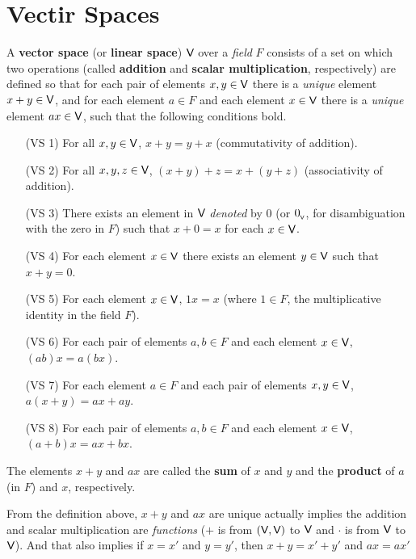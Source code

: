 \section{Vectir Spaces} \label{sec 1.2}

\begin{definition} \label{def 1.1}
A \textbf{vector space} (or \textbf{linear space}) \(\textsf{V}\) over a \emph{field} \(F\) consists of a set on which two operations (called \textbf{addition} and \textbf{scalar multiplication}, respectively) are defined
so that for each pair of elements \(x, y \in \textsf{V}\) there is a \emph{unique} element \(x + y \in \textsf{V}\),
and for each element \(a \in F\) and each element \(x \in \textsf{V}\) there is a \emph{unique} element \(ax \in \textsf{V}\), such that the following conditions bold.
\begin{itemize}
    \item[(VS 1)] For all \(x, y \in \textsf{V}\), \(x + y = y + x\) (commutativity of addition).
    \item[(VS 2)] For all \(x, y, z \in \textsf{V}\), \((x + y) + z = x + (y + z)\) (associativity of addition).
    \item[(VS 3)] There exists an element in \(\textsf{V}\) \emph{denoted} by \(0\) (or \(0_{_{\textsf{V}}}\), for disambiguation with the zero in \(F\)) such that \(x + 0 = x\) for each \(x \in \textsf{V}\).
    \item[(VS 4)] For each element \(x \in \textsf{V}\) there exists an element \(y \in \textsf{V}\) such that \(x + y = 0\).
    \item[(VS 5)] For each element \(x \in \textsf{V}\), \(1 x = x\) (where \(1 \in F\), the multiplicative identity in the field \(F\)).
    \item[(VS 6)] For each pair of elements \(a, b \in F\) and each element \(x \in \textsf{V}\), \((ab)x = a(bx)\).
    \item[(VS 7)] For each element \(a \in F\) and each pair of elements \(x, y \in \textsf{V}\), \(a(x + y) = ax + ay\).
    \item[(VS 8)] For each pair of elements \(a, b \in F\) and each element \(x \in \textsf{V}\), \((a + b)x = ax+ bx\).
\end{itemize}
The elements \(x + y\) and \(ax\) are called the \textbf{sum} of \(x\) and \(y\) and the \textbf{product} of \(a\) (in \(F\)) and \(x\), respectively.
\end{definition}

\begin{remark}
From the definition above, \(x + y\) and \(ax\) are unique actually implies the addition and scalar multiplication are \emph{functions} (\(+\) is from \((\textsf{V}, \textsf{V})\) to \(\textsf{V}\) and \(\cdot\) is from \(\textsf{V}\) to \(\textsf{V}\)).
And that also implies if \(x = x'\) and \(y = y'\), then \(x + y = x' + y'\) and \(ax = ax'\)
\end{remark}

